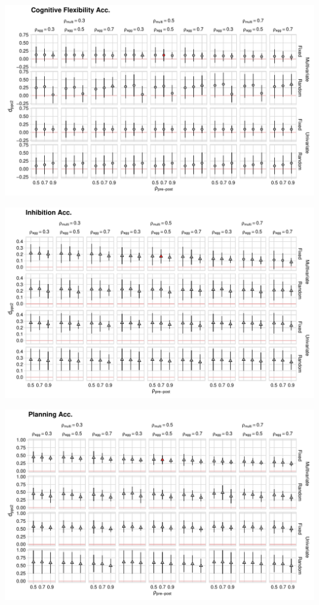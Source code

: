 \documentclass[
]{article}
\begin{document}
\begin{landscape}


\begin{center}\includegraphics[width=648px]{supplementary_files/figure-latex/cognitive-flessibility-plot-1} \end{center}


\begin{center}\includegraphics[width=648px]{supplementary_files/figure-latex/inhibition-accuracy-plot-1} \end{center}


\begin{center}\includegraphics[width=648px]{supplementary_files/figure-latex/planning-accuracy-plot-1} \end{center}



\end{landscape}
\end{document}
